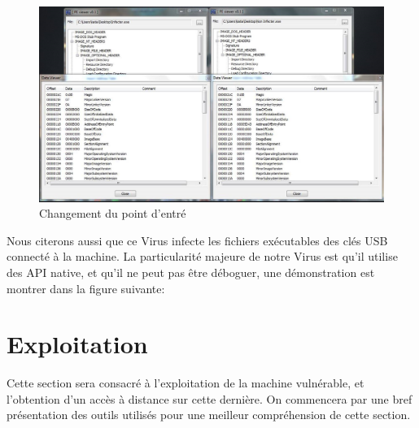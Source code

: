     \begin{figure}[h]
        \centering
        \includegraphics[width=\linewidth]{images/pe_changes.png}
        \caption{Changement du point d'entré}
        \label{changement_point_entree}
    \end{figure}

    Nous citerons aussi que ce Virus infecte les fichiers exécutables des clés USB connecté à la machine.
    La particularité majeure de notre Virus est qu’il utilise des API native, et qu’il ne peut pas être 
    déboguer, une démonstration est montrer dans la figure suivante:

\section{Exploitation}
Cette section sera consacré à l'exploitation de la machine vulnérable, et l'obtention d'un accès à distance
sur cette dernière. On commencera par une bref présentation des outils utilisés pour une meilleur compréhension
de cette section.
